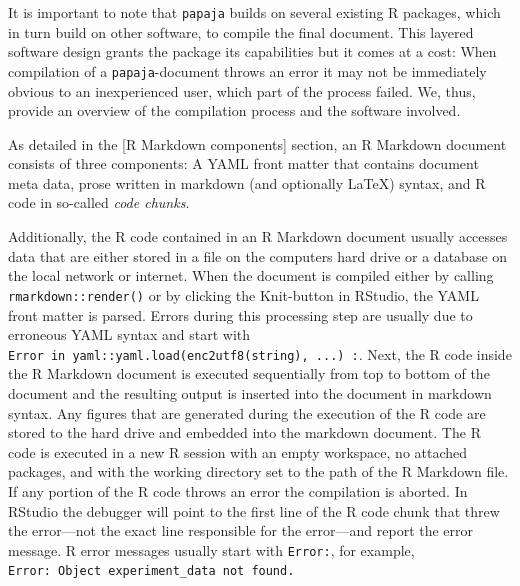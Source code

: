 \documentclass[man,floatsintext]{apa6}
\theoremstyle{definition}
\theoremstyle{definition}
\theoremstyle{definition}
\theoremstyle{remark}
\begin{document}
It is important to note that \texttt{papaja} builds on several existing
R packages, which in turn build on other software, to compile the final
document. This layered software design grants the package its
capabilities but it comes at a cost: When compilation of a
\texttt{papaja}-document throws an error it may not be immediately
obvious to an inexperienced user, which part of the process failed. We,
thus, provide an overview of the compilation process and the software
involved.

As detailed in the {[}R Markdown components{]} section, an R Markdown
document consists of three components: A YAML front matter that contains
document meta data, prose written in markdown (and optionally LaTeX)
syntax, and R code in so-called \emph{code chunks}.

Additionally, the R code contained in an R Markdown document usually
accesses data that are either stored in a file on the computers hard
drive or a database on the local network or internet. When the document
is compiled either by calling \texttt{rmarkdown::render()} or by
clicking the Knit-button in RStudio, the YAML front matter is parsed.
Errors during this processing step are usually due to erroneous YAML
syntax and start with
\texttt{Error\ in\ yaml::yaml.load(enc2utf8(string),\ ...)\ :}. Next,
the R code inside the R Markdown document is executed sequentially from
top to bottom of the document and the resulting output is inserted into
the document in markdown syntax. Any figures that are generated during
the execution of the R code are stored to the hard drive and embedded
into the markdown document. The R code is executed in a new R session
with an empty workspace, no attached packages, and with the working
directory set to the path of the R Markdown file. If any portion of the
R code throws an error the compilation is aborted. In RStudio the
debugger will point to the first line of the R code chunk that threw the
error---not the exact line responsible for the error---and report the
error message. R error messages usually start with \texttt{Error:}, for
example,
\texttt{Error:\ Object\ \textquotesingle{}experiment\_data\textquotesingle{}\ not\ found.}
\end{document}
